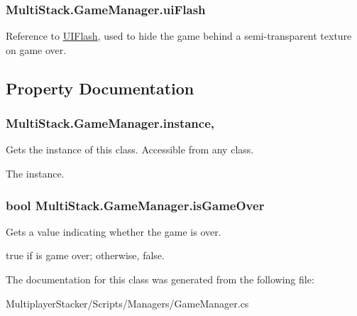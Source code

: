\subsubsection[{ui\+Flash}]{ Multi\+Stack.\+Game\+Manager.\+ui\+Flash}\label{class_multi_stack_1_1_game_manager_aa3378e26e4669efb5cc272dfb2c80d6a}


Reference to \hyperlink{class_multi_stack_1_1_u_i_flash}{U\+I\+Flash}, used to hide the game behind a semi-\/transparent texture on game over. 



\subsection{Property Documentation}
\hypertarget{class_multi_stack_1_1_game_manager_a80429580a27850ee0b78b84ec7cb283e}{}
\subsubsection[{instance}]{ Multi\+Stack.\+Game\+Manager.\+instance\hspace{0.3cm}{\ttfamily [static]}, {\ttfamily [get]}}\label{class_multi_stack_1_1_game_manager_a80429580a27850ee0b78b84ec7cb283e}


Gets the instance of this class. Accessible from any class. 

The instance.\hypertarget{class_multi_stack_1_1_game_manager_afe212dfefd75cfeb1e3fcc817bb92b64}{}
\subsubsection[{is\+Game\+Over}]{\setlength{\rightskip}{0pt plus 5cm}bool Multi\+Stack.\+Game\+Manager.\+is\+Game\+Over\hspace{0.3cm}{\ttfamily [get]}}\label{class_multi_stack_1_1_game_manager_afe212dfefd75cfeb1e3fcc817bb92b64}


Gets a value indicating whether the game is over. 

{\ttfamily true} if is game over; otherwise, {\ttfamily false}.

The documentation for this class was generated from the following file\+:\begin{DoxyCompactItemize}
\item 
Multiplayer\+Stacker/\+Scripts/\+Managers/Game\+Manager.\+cs\end{DoxyCompactItemize}

